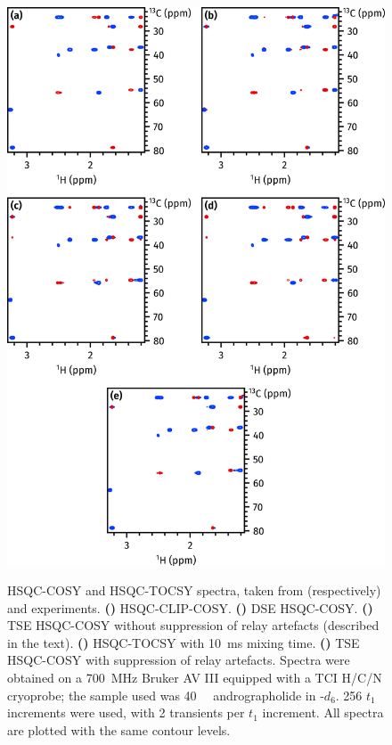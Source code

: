 \documentclass[a4paper,12pt]{article}
\newcommand{\andro}{Spectra were obtained on a \SI{700}{\MHz} Bruker AV III equipped with a TCI H/C/N cryoprobe; the sample used was \SI{40}{\milli\molar} andrographolide in \ch{DMSO}-$d_6$.}
\begin{document}
\begin{refsection}
\begin{figure}[!htp]
    \centering
    \includegraphics[]{hsqccosy_comp.png}%
    {\label{fig:hsqccosy_comp_clip}}%
    {\label{fig:hsqccosy_comp_dse}}%
    {\label{fig:hsqccosy_comp_tse_norps}}%
    {\label{fig:hsqccosy_comp_tocsy}}%
    {\label{fig:hsqccosy_comp_tse}}%
    \caption[Comparison of spectra acquired with different HSQC-COSY modules]{
        HSQC-COSY and HSQC-TOCSY spectra, taken from (respectively)  and  experiments.
        \textbf{()} HSQC-CLIP-COSY.
        \textbf{()} DSE HSQC-COSY.
        \textbf{()} TSE HSQC-COSY without suppression of relay artefacts (described in the text).
        \textbf{()} HSQC-TOCSY with \qty{10}{\ms} mixing time.
        \textbf{()} TSE HSQC-COSY with suppression of relay artefacts.
        \andro{}
        256 $t_1$ increments were used, with 2 transients per $t_1$ increment.
        All spectra are plotted with the same contour levels.
    }
    \label{fig:hsqccosy_comp}
\end{figure}


\end{refsection}
\end{document}
